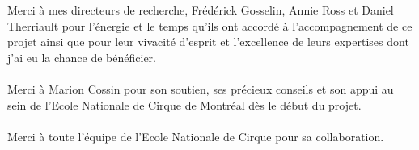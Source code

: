 %
%
Merci à mes directeurs de recherche, Frédérick Gosselin, Annie Ross et Daniel Therriault pour l'énergie et le temps qu'ils ont accordé à l'accompagnement de ce projet ainsi que pour leur vivacité d'esprit et l'excellence de leurs expertises dont j'ai eu la chance de bénéficier. \\\\
Merci à Marion Cossin pour son soutien, ses précieux conseils et son appui au sein de l'Ecole Nationale de Cirque de Montréal dès le début du projet.\\\\
Merci à toute l'équipe de l'Ecole Nationale de Cirque pour sa collaboration.
